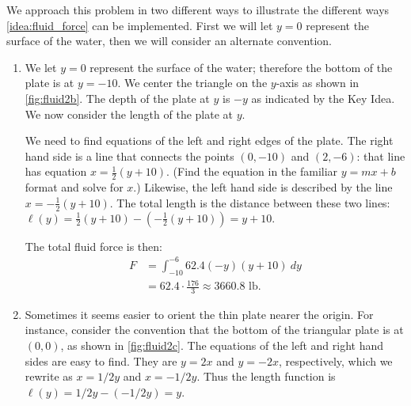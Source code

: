 {We approach this problem in two different ways to illustrate the different ways \autoref{idea:fluid_force} can be implemented. First we will let $y=0$ represent the surface of the water, then we will consider an alternate convention.
\begin{enumerate}
	\item	We let $y=0$ represent the surface of the water; therefore the bottom of the plate is at $y=-10$. We center the triangle on the $y$-axis as shown in \autoref{fig:fluid2b}. The depth of the plate at $y$ is $-y$ as indicated by the Key Idea. We now consider the length of the plate at $y$.

	We need to find equations of the left and right edges of the plate. The right hand side is a line that connects the points $(0,-10)$ and $(2,-6)$: that line has equation $x=\frac12(y+10)$. (Find the equation in the familiar $y=mx+b$ format and solve for $x$.) Likewise, the left hand side is described by the line $x=-\frac12(y+10)$. The total length is the distance between these two lines: $\ell(y)=\frac12(y+10) - (-\frac12(y+10)) = y+10.$
	
The total fluid force is then:
\begin{align*}
	F 	&=	\int_{-10}^{-6} 62.4(-y)(y+10)\ dy \\
		&=	62.4\cdot \frac{176}{3} \approx	3660.8\text{ lb}.
\end{align*}	

	\item	Sometimes it seems easier to orient the thin plate nearer the origin. For instance, consider the convention that the bottom of the triangular plate is at $(0,0)$, as shown in \autoref{fig:fluid2c}. The equations of the left and right hand sides are easy to find. They are $y=2x$ and $y=-2x$, respectively, which we rewrite as $x= 1/2y$ and $x=-1/2y$. Thus the length function is $\ell(y) = 1/2y-(-1/2y) = y$. 


\end{enumerate}}
